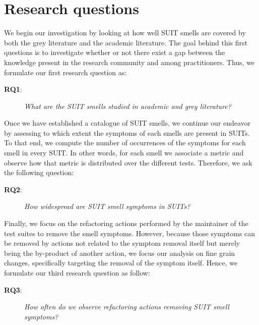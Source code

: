 \section{Research questions}


We begin our investigation by looking at how well SUIT smells are covered by both the grey literature and the academic literature. The goal behind this first questions is to investigate whether or not there exist a gap between the knowledge present in the research community and among practitioners. Thus, we formulate our first research question as:

\begin{description} 
\item[\textbf{RQ1}:]
\emph{What are the SUIT smells studied in academic and grey literature?} 
\end{description} 

Once we have established a catalogue of SUIT smells, we continue our endeavor by assessing to which extent the symptoms of each smells are present in SUITs. To that end, we compute the number of occurrences of the symptoms for each smell in every SUIT. In other words, for each smell we associate a metric and observe how that metric is distributed over the different tests. Therefore, we ask the following question:

\begin{description} 
\item[\textbf{RQ2}:]
\emph{How widespread are SUIT smell symptoms in SUITs?} 
\end{description} 

Finally, we focus on the refactoring actions performed by the maintainer of the test suites to remove the smell symptoms. However, because those symptoms can be removed by actions not related to the symptom removal itself but merely being the by-product of another action, we focus our analysis on fine grain changes, specifically targeting the removal of the symptom itself. Hence, we formulate our third research question as follow:

\begin{description} 
\item[\textbf{RQ3}:]
\emph{How often do we observe refactoring actions removing SUIT smell symptoms?} 
\end{description} 